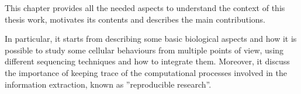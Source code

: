 This chapter provides all the needed aspects to understand the context of this thesis work, motivates its contents and describes the main contributions.

In particular, it starts from describing some basic biological aspects and how it is possible to study some cellular behaviours from multiple points of view, using different sequencing techniques and how to integrate them.
Moreover, it discuss the importance of keeping trace of the computational processes involved in the information extraction, known as ''reproducible research''.


